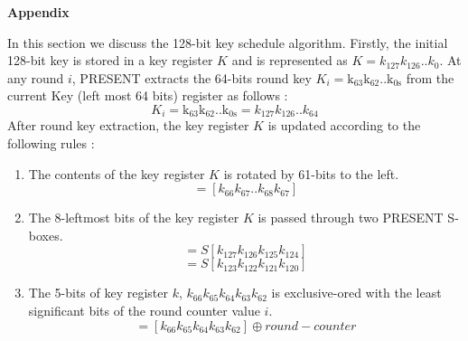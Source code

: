 \documentclass[preprint]{transcrypto}
\begin{document}
\medskip
\printbibliography[title={References}] 
\pagebreak
\begin{center}
    \Large{\textbf{Appendix}}
\end{center}
In this section we discuss the 128-bit key schedule algorithm. Firstly, the initial 128-bit key is stored in a key register $K$ and is represented as $K = k_{127}k_{126}$..$k_0$. At any round $i$, PRESENT extracts the 64-bits round key $K_i = \mathrm{k_{63}}\mathrm{k_{62}}$..$\mathrm{k_{0s}}$ from the current Key (left most 64 bits) register as follows : 
\begin{equation*}
    K_i = \mathrm{k_{63}}\mathrm{k_{62}}..\mathrm{k_{0s}} = k_{127}k_{126}..k_{64}
\end{equation*}
After round key extraction, the key register $K$ is updated according to the following rules : 
\begin{enumerate}
    \item The contents of the key register $K$ is rotated by 61-bits to the left.
    \begin{equation*}
        [k_{127}k_{126}..k_{0}] = [k_{66}k_{67}..k_{68}k_{67}]
    \end{equation*}
    \item The 8-leftmost bits of the key register $K$ is passed through two PRESENT S-boxes.
    \begin{equation*}
        [k_{127}k_{126}k_{125}k_{124}] = S[k_{127}k_{126}k_{125}k_{124}]
    \end{equation*}
    \begin{equation*}
        [k_{123}k_{122}k_{121}k_{120}] = S[k_{123}k_{122}k_{121}k_{120}]
    \end{equation*}
        
    
    \item The 5-bits of key register $k$, $k_{66}k_{65}k_{64}k_{63}k_{62}$ is exclusive-ored with the least significant bits of the round counter value $i$. 
    \begin{equation*}
        [k_{66}k_{65}k_{64}k_{63}k_{62}] = [k_{66}k_{65}k_{64}k_{63}k_{62}] \oplus round-counter
    \end{equation*}
\end{enumerate}


% 
% 
\end{document}
